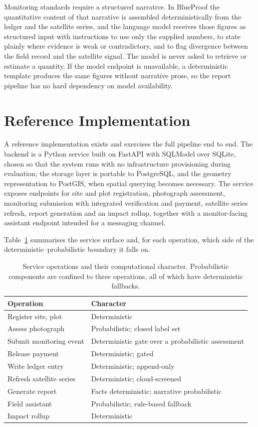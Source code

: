 \documentclass[10pt,twocolumn,a4paper]{article}
\begin{document}
Monitoring standards require a structured narrative. In BlueProof the
quantitative content of that narrative is assembled deterministically from the
ledger and the satellite series, and the language model receives those figures
as structured input with instructions to use only the supplied numbers, to state
plainly where evidence is weak or contradictory, and to flag divergence between
the field record and the satellite signal. The model is never asked to retrieve
or estimate a quantity. If the model endpoint is unavailable, a deterministic
template produces the same figures without narrative prose, so the report
pipeline has no hard dependency on model availability.

\section{Reference Implementation}

A reference implementation exists and exercises the full pipeline end to end.
The backend is a Python service built on FastAPI with SQLModel over SQLite,
chosen so that the system runs with no infrastructure provisioning during
evaluation; the storage layer is portable to PostgreSQL, and the geometry
representation to PostGIS, when spatial querying becomes necessary. The service
exposes endpoints for site and plot registration, photograph assessment,
monitoring submission with integrated verification and payment, satellite series
refresh, report generation and an impact rollup, together with a monitor-facing
assistant endpoint intended for a messaging channel.

Table~\ref{tab:api} summarises the service surface and, for each operation,
which side of the deterministic--probabilistic boundary it falls on.

\begin{table}[t]
\centering
\small
\caption{Service operations and their computational character. Probabilistic
components are confined to three operations, all of which have deterministic
fallbacks.}
\label{tab:api}
\begin{tabular}{@{}p{3.35cm}p{4.0cm}@{}}
\toprule
\textbf{Operation} & \textbf{Character} \\
\midrule
Register site, plot & Deterministic \\
Assess photograph & Probabilistic; closed label set \\
Submit monitoring event & Deterministic gate over a probabilistic assessment \\
Release payment & Deterministic; gated \\
Write ledger entry & Deterministic; append-only \\
Refresh satellite series & Deterministic; cloud-screened \\
Generate report & Facts deterministic; narrative probabilistic \\
Field assistant & Probabilistic; rule-based fallback \\
Impact rollup & Deterministic \\
\bottomrule
\end{tabular}
\end{table}
\end{document}
